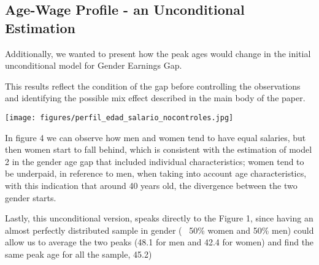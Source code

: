 \documentclass[12pt,a4paper,onecolumn]{article}
\begin{document}
\subsection{Age-Wage Profile - an Unconditional Estimation}

Additionally, we wanted to present how the peak ages would change in the initial unconditional model for Gender Earnings Gap.

This results reflect the condition of the gap before controlling the observations and identifying the possible mix effect described in the main body of the paper.



\begin{center}
  \captionsetup{type=figure,position=top}
  \label{fig:agecurve3}

  \texttt{[image: figures/perfil\_edad\_salario\_nocontroles.jpg]}
\end{center}

In figure 4 we can observe how men and women tend to have equal salaries, but then women start to fall behind, which is consistent with the estimation of model 2 in the gender age gap that included individual characteristics; women tend to be underpaid, in reference to men, when taking into account age characteristics, with this indication that around 40 years old, the divergence between the two gender starts.

Lastly, this unconditional version, speaks directly to the Figure 1, since having an almost perfectly distributed sample in gender (~ 50\% women and 50\% men) could allow us to average the two peaks (48.1 for men and 42.4 for women) and find the same peak age for all the sample, 45.2)
\end{document}
